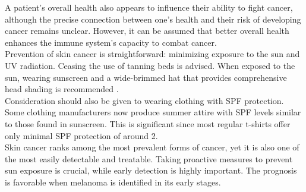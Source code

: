 A patient's overall health also appears to influence their ability to fight cancer, although the precise connection between one's health and their risk of developing cancer remains unclear. However, it can be assumed that better overall health enhances the immune system's capacity to combat cancer. \\

Prevention of skin cancer is straightforward: minimizing exposure to the sun and UV radiation. Ceasing the use of tanning beds is advised. When exposed to the sun, wearing sunscreen and a wide-brimmed hat that provides comprehensive head shading is recommended \cite{OrigenAndTreatment}. \\

Consideration should also be given to wearing clothing with SPF protection. Some clothing manufacturers now produce summer attire with SPF levels similar to those found in sunscreen. This is significant since most regular t-shirts offer only minimal SPF protection of around 2. \\

Skin cancer ranks among the most prevalent forms of cancer, yet it is also one of the most easily detectable and treatable. Taking proactive measures to prevent sun exposure is crucial, while early detection is highly important. The prognosis is favorable when melanoma is identified in its early stages.
